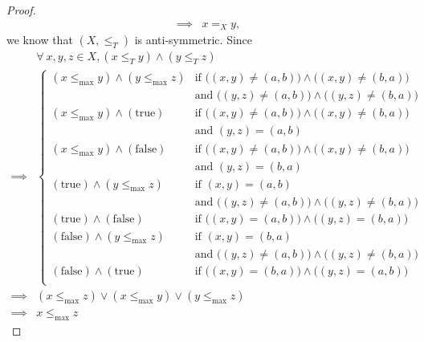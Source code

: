 \begin{proof}
\begin{align*}
        \implies & x =_X y,
    \end{align*}
    we know that \((X, \leq_T)\) is anti-symmetric.
    Since
    \begin{align*}
                 & \forall\ x, y, z \in X, (x \leq_T y) \land (y \leq_T z)         \\
        \implies & \begin{cases}
            (x \leq_{\max} y) \land (y \leq_{\max} z) & \text{if } \big((x, y) \neq (a, b)\big) \land \big((x, y) \neq (b, a)\big)  \\
                                                      & \text{and } \big((y, z) \neq (a, b)\big) \land \big((y, z) \neq (b, a)\big) \\
            (x \leq_{\max} y) \land (\text{true})     & \text{if } \big((x, y) \neq (a, b)\big) \land \big((x, y) \neq (b, a)\big)  \\
                                                      & \text{and } (y, z) = (a, b)                                                 \\
            (x \leq_{\max} y) \land (\text{false})    & \text{if } \big((x, y) \neq (a, b)\big) \land \big((x, y) \neq (b, a)\big)  \\
                                                      & \text{and } (y, z) = (b, a)                                                 \\
            (\text{true}) \land (y \leq_{\max} z)     & \text{if } (x, y) = (a, b)                                                  \\
                                                      & \text{and } \big((y, z) \neq (a, b)\big) \land \big((y, z) \neq (b, a)\big) \\
            (\text{true}) \land (\text{false})        & \text{if } \big((x, y) = (a, b)\big) \land \big((y, z) = (b, a)\big)        \\
            (\text{false}) \land (y \leq_{\max} z)    & \text{if } (x, y) = (b, a)                                                  \\
                                                      & \text{and } \big((y, z) \neq (a, b)\big) \land \big((y, z) \neq (b, a)\big) \\
            (\text{false}) \land (\text{true})        & \text{if } \big((x, y) = (b, a)\big) \land \big((y, z) = (a, b)\big)        \\
        \end{cases}                                      \\
        \implies & (x \leq_{\max} z) \lor (x \leq_{\max} y) \lor (y \leq_{\max} z) \\
        \implies & x \leq_{\max} z
    \end{align*}
\end{proof}

